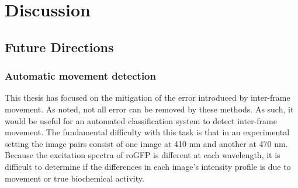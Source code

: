 
\chapter{Discussion} %

\label{Chapter4} %

\section{Future Directions}

\subsection{Automatic movement detection}

This thesis has focused on the mitigation of the error introduced by inter-frame movement. As noted, not all error can be removed by these methods. As such, it would be useful for an automated classification system to detect inter-frame movement. The fundamental difficulty with this task is that in an experimental setting the image pairs consist of one image at 410 nm and another at 470 nm. Because the excitation spectra of roGFP is different at each wavelength, it is difficult to determine if the differences in each image's intensity profile is due to movement or true biochemical activity.

